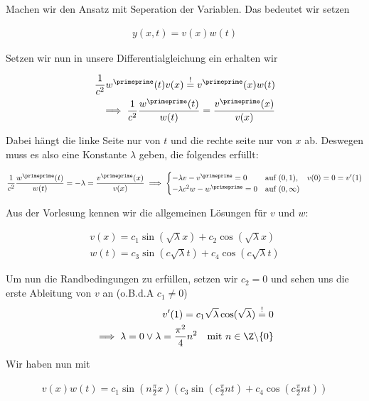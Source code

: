 \begin{solution}
Machen wir den Ansatz mit Seperation der Variablen. Das bedeutet wir setzen

\begin{align*}
  y(x,t)
  =
  v(x)w(t)
\end{align*}

Setzen wir nun in unsere Differentialgleichung ein erhalten wir

\begin{align*}
  \frac{1}{c^2}w^\primeprime(t)v(x)
  \stackrel{!}{=}
  v^\primeprime(x)w(t) \\
  \implies
  \frac{1}{c^2}\frac{w^\primeprime(t)}{w(t)}
  =
  \frac{v^\primeprime(x)}{v(x)}
\end{align*}

Dabei hängt die linke Seite nur von $t$ und die rechte seite nur von $x$ ab. Deswegen
muss es also eine Konstante $\lambda$ geben, die folgendes erfüllt:

\begin{align*}
  \frac{1}{c^2}\frac{w^\primeprime(t)}{w(t)}
  =
  -\lambda
  =
  \frac{v^\primeprime(x)}{v(x)}
  \implies
  \begin{cases}
    -\lambda v - v^\primeprime = 0 & \text{auf } (0,1), \quad v(0)=0=v^\prime(1) \\
    -\lambda c^2 w - w^\primeprime = 0 & \text{auf }(0,\infty)
  \end{cases}
\end{align*}

Aus der Vorlesung kennen wir die allgemeinen Lösungen für $v$ und  $w$:

\begin{align*}
  v(x) = c_1 \sin(\sqrt{\lambda}x) + c_2 \cos(\sqrt{\lambda}x) \\
  w(t) = c_3 \sin(c\sqrt{\lambda}t) + c_4 \cos(c\sqrt{\lambda}t)
\end{align*}

Um nun die Randbedingungen zu erfüllen, setzen wir $c_2 = 0$ und sehen uns die erste Ableitung
von $v$ an (o.B.d.A $c_1 \neq 0$)
\begin{align*}
  v^\prime(1)
  =
  c_1 \sqrt{\lambda}\cos(\sqrt{\lambda})
  \stackrel{!}{=}
  0 \\
  \implies
  \lambda = 0
  \lor
  \lambda
  =
  \frac{\pi^2}{4}n^2 \quad \text{mit } n\in \Z \backslash\{0\}
\end{align*}

Wir haben nun mit

\begin{align*}
  v(x)w(t)
  =
  c_1\sin(n\frac{\pi}{2} x)
  (c_3 \sin(c\frac{\pi}{2}nt) +
  c_4 \cos(c\frac{\pi}{2}nt))
\end{align*}


\end{solution}
